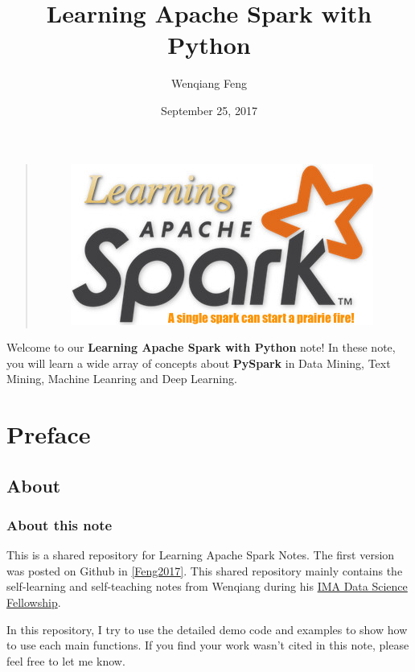 \documentclass[letterpaper,11pt,english]{sphinxmanual}
\title{Learning Apache Spark with Python}
\date{September 25, 2017}
\author{Wenqiang Feng}
\begin{document}
\maketitle
\tableofcontents
{}\label{index::doc}\label{index:index}\begin{quote}
\begin{figure}[htbp]
\centering

\includegraphics{logo.jpg}
\label{index:fig-logo}\end{figure}
\end{quote}

Welcome to our \textbf{Learning Apache Spark with Python} note!
In these note, you will learn a wide array of concepts about
\textbf{PySpark} in Data Mining, Text Mining, Machine Leanring
and Deep Learning.




\chapter{Preface}
\label{preface:id1}\label{preface::doc}\label{preface:contents}\label{preface:preface}

\section{About}
\label{preface:about}

\subsection{About this note}
\label{preface:about-this-note}
This is a shared repository for Learning Apache Spark Notes.
The first version was posted on Github in {\hyperref[reference:feng2017]{{[}Feng2017{]}}}.
This shared repository mainly contains the self-learning and
self-teaching notes from Wenqiang during his \href{https://www.ima.umn.edu/2016-2017/SW1.23-3.10.17\#}{IMA Data Science
Fellowship}.

In this repository, I try to use the detailed demo code and
examples to show how to use each main functions. If you find
your work wasn’t cited in this note, please feel free to let
me know.
\end{document}

